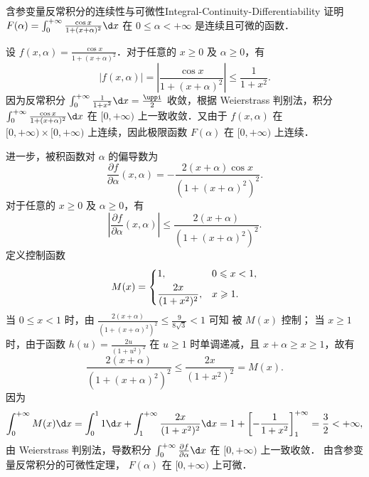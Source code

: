\begin{problem}{含参变量反常积分的连续性与可微性}{Integral-Continuity-Differentiability}
    证明 $F(\alpha) = \int_0^{+\infty} \frac{\cos x}{1+(x+\alpha)^2} \d x$ 在 $0 \leqslant \alpha < +\infty$ 是连续且可微的函数．
\end{problem}

\begin{myproof}
    设 $f(x, \alpha) = \frac{\cos x}{1+(x+\alpha)^2}$．对于任意的 $x \geqslant 0$ 及 $\alpha \geqslant 0$，有
    \begin{equation}\label{eq:continuity-bound}
        \left| f(x, \alpha) \right| = \left| \frac{\cos x}{1+(x+\alpha)^2} \right| \leqslant \frac{1}{1+x^2}.
    \end{equation}
    因为反常积分 $\int_0^{+\infty} \frac{1}{1+x^2} \d x = \frac{\uppi}{2}$ 收敛，根据 Weierstrass 判别法，积分 $\int_0^{+\infty} \frac{\cos x}{1+(x+\alpha)^2} \d x$ 在 $[0, +\infty)$ 上一致收敛．又由于 $f(x, \alpha)$ 在 $[0, +\infty) \times [0, +\infty)$ 上连续，因此极限函数 $F(\alpha)$ 在 $[0, +\infty)$ 上连续．

    进一步，被积函数对 $\alpha$ 的偏导数为
    \begin{equation}\label{eq:partial-deriv}
        \frac{\partial f}{\partial \alpha}(x, \alpha) = -\frac{2(x+\alpha)\cos x}{\left(1+(x+\alpha)^2\right)^2}.
    \end{equation}
    对于任意的 $x \geqslant 0$ 及 $\alpha \geqslant 0$，有
    \begin{equation}\label{eq:deriv-bound}
        \left| \frac{\partial f}{\partial \alpha}(x, \alpha) \right| \leqslant \frac{2(x+\alpha)}{\left(1+(x+\alpha)^2\right)^2}.
    \end{equation}
    定义控制函数
    \begin{equation}\label{eq:control-function}
        M(x) = \begin{dcases} 1, & 0 \leqslant x < 1, \\ \frac{2x}{(1+x^2)^2}, & x \geqslant 1. \end{dcases}
    \end{equation}
    当 $0 \leqslant x < 1$ 时，由 $\frac{2(x+\alpha)}{(1+(x+\alpha)^2)^2} \leqslant \frac{9}{8\sqrt{3}} < 1$ 可知  被 $M(x)$ 控制；
    当 $x \geqslant 1$ 时，由于函数 $h(u) = \frac{2u}{(1+u^2)^2}$ 在 $u \geqslant 1$ 时单调递减，且 $x+\alpha \geqslant x \geqslant 1$，故有
    \begin{equation}\label{eq:bound-large-x}
        \frac{2(x+\alpha)}{\left(1+(x+\alpha)^2\right)^2} \leqslant \frac{2x}{(1+x^2)^2} = M(x).
    \end{equation}
    因为
    \begin{equation}\label{eq:control-integral}
        \int_0^{+\infty} M(x) \d x = \int_0^1 1 \d x + \int_1^{+\infty} \frac{2x}{(1+x^2)^2} \d x = 1 + \left[ -\frac{1}{1+x^2} \right]_1^{+\infty} = \frac{3}{2} < +\infty,
    \end{equation}
    由 Weierstrass 判别法，导数积分 $\int_0^{+\infty} \frac{\partial f}{\partial \alpha} \d x$ 在 $[0, +\infty)$ 上一致收敛．
    由含参变量反常积分的可微性定理， $F(\alpha)$ 在 $[0, +\infty)$ 上可微．
\end{myproof}

